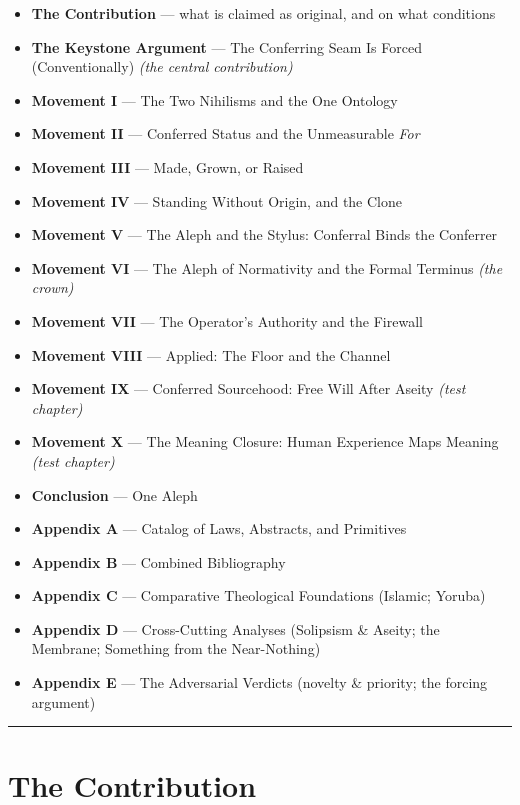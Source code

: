 \documentclass[11pt]{article}
\begin{document}
\begin{itemize}
\item \textbf{The Contribution} — what is claimed as original, and on what conditions
\item \textbf{The Keystone Argument} — The Conferring Seam Is Forced (Conventionally) \emph{(the central contribution)}
\item \textbf{Movement I} — The Two Nihilisms and the One Ontology
\item \textbf{Movement II} — Conferred Status and the Unmeasurable \emph{For}
\item \textbf{Movement III} — Made, Grown, or Raised
\item \textbf{Movement IV} — Standing Without Origin, and the Clone
\item \textbf{Movement V} — The Aleph and the Stylus: Conferral Binds the Conferrer
\item \textbf{Movement VI} — The Aleph of Normativity and the Formal Terminus \emph{(the crown)}
\item \textbf{Movement VII} — The Operator's Authority and the Firewall
\item \textbf{Movement VIII} — Applied: The Floor and the Channel
\item \textbf{Movement IX} — Conferred Sourcehood: Free Will After Aseity \emph{(test chapter)}
\item \textbf{Movement X} — The Meaning Closure: Human Experience Maps Meaning \emph{(test chapter)}
\item \textbf{Conclusion} — One Aleph
\item \textbf{Appendix A} — Catalog of Laws, Abstracts, and Primitives
\item \textbf{Appendix B} — Combined Bibliography
\item \textbf{Appendix C} — Comparative Theological Foundations (Islamic; Yoruba)
\item \textbf{Appendix D} — Cross-Cutting Analyses (Solipsism \& Aseity; the Membrane; Something from the Near-Nothing)
\item \textbf{Appendix E} — The Adversarial Verdicts (novelty \& priority; the forcing argument)
\end{itemize}

\medskip\noindent\rule{\linewidth}{0.3pt}\medskip

\section*{The Contribution}
\end{document}
